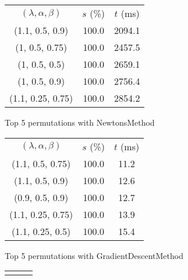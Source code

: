 \begin{figure}[H]
\label{fig:param_comp_NegativeEntropy_ArmijoSearch}
\begin{subfigure}[ht]{.5\textwidth}
\begin{tabular}{|c|c|c|}
\hline
\rowcolor{gray!25}
\multicolumn{3}{|c|}{NewtonsMethod} \\
\hline
\rowcolor{gray!25}
$(\lambda,\alpha,\beta)$ & $s$ (\%) & $t$ (ms) \\
\hline
(1.1, 0.5, 0.9) & 100.0 & 2094.1 \\
(1, 0.5, 0.75) & 100.0 & 2457.5 \\
(1, 0.5, 0.5) & 100.0 & 2659.1 \\
(1, 0.5, 0.9) & 100.0 & 2756.4 \\
(1.1, 0.25, 0.75) & 100.0 & 2854.2 \\
\hline
\end{tabular}
\caption{Top 5 permutations with NewtonsMethod}
\label{subfig:param_comp_NegativeEntropy_NewtonsMethod_ArmijoSearch}
\end{subfigure}
\hfill
\begin{subfigure}[ht]{.5\textwidth}
\begin{tabular}{|c|c|c|}
\hline
\rowcolor{gray!25}
\multicolumn{3}{|c|}{GradientDescentMethod} \\
\hline
\rowcolor{gray!25}
$(\lambda,\alpha,\beta)$ & $s$ (\%) & $t$ (ms) \\
\hline
(1.1, 0.5, 0.75) & 100.0 & 11.2 \\
(1.1, 0.5, 0.9) & 100.0 & 12.6 \\
(0.9, 0.5, 0.9) & 100.0 & 12.7 \\
(1.1, 0.25, 0.75) & 100.0 & 13.9 \\
(1.1, 0.25, 0.5) & 100.0 & 15.4 \\
\hline
\end{tabular}
\caption{Top 5 permutations with GradientDescentMethod}
\label{subfig:param_comp_NegativeEntropy_GradientDescentMethod_ArmijoSearch}
\end{subfigure}
\hfill
\begin{subfigure}[ht]{.5\textwidth}
\begin{tabular}{|c|c|c|}
\hline
\rowcolor{gray!25}
\multicolumn{3}{|c|}{ConjugateGradientMethod} \\

\end{tabular}
\end{subfigure}
\end{figure}
